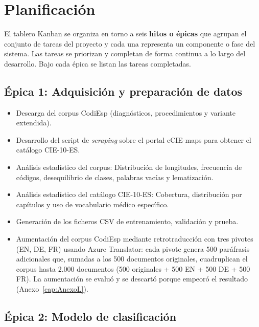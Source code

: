 \section{Planificación}

El tablero Kanban se organiza en torno a seis \textbf{hitos o épicas} que agrupan el conjunto de tareas del proyecto y cada una representa un componente o fase del sistema. Las tareas se priorizan y completan de forma continua a lo largo del desarrollo. Bajo cada épica se listan las tareas completadas.

\subsection{Épica 1: Adquisición y preparación de datos}

\begin{itemize}[noitemsep]
 \item Descarga del corpus CodiEsp (diagnósticos, procedimientos y variante extendida).
 \item Desarrollo del script de \emph{scraping} sobre el portal eCIE-maps para obtener el catálogo CIE-10-ES.
 \item Análisis estadístico del corpus: Distribución de longitudes, frecuencia de códigos, desequilibrio de clases, palabras vacías y lematización.
 \item Análisis estadístico del catálogo CIE-10-ES: Cobertura, distribución por capítulos y uso de vocabulario médico específico.
 \item Generación de los ficheros CSV de entrenamiento, validación y prueba.
 \item Aumentación del corpus CodiEsp mediante retrotraducción con tres pivotes (EN, DE, FR) usando Azure Translator: cada pivote genera 500 paráfrasis adicionales que, sumadas a los 500 documentos originales, cuadruplican el corpus hasta 2.000 documentos (500 originales + 500 EN + 500 DE + 500 FR). La aumentación se evaluó y se descartó porque empeoró el resultado (Anexo~\ref{cap:AnexoL}).
\end{itemize}

\subsection{Épica 2: Modelo de clasificación}

